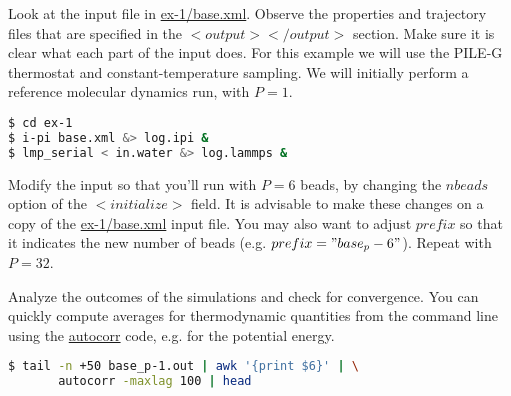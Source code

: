 \documentclass{article}
\begin{document}
\begin{Exercise}[label={basic},title={A PIMD simulation of liquid water}]

\Question 
Look at the \ipi{} input file in \url{ex-1/base.xml}. Observe the 
properties and trajectory files that are specified in the \lstinxml$<output></output>$ section. 
Make sure it is clear what each part 
of the input does. For this example
we will use the PILE-G thermostat\cite{ceri+11jcp} and 
constant-temperature sampling. We will 
initially perform a reference molecular dynamics run, with $P=1$. 

\begin{lstlisting}[language=bash]
$ cd ex-1 
$ i-pi base.xml &> log.ipi &
$ lmp_serial < in.water &> log.lammps & 
\end{lstlisting}%

\Question
Modify the input so that you'll run with
$P=6$ beads, by changing the \lstinxml$nbeads$ option of the \lstinxml$<initialize>$ field. 
It is advisable to make these changes on a copy of the  \url{ex-1/base.xml} input file.
You may also want to adjust \lstinxml$prefix$ so that it indicates the new number of beads (e.g. \lstinxml$prefix="base_p-6"$).
Repeat with $P=32$. 

\Question
Analyze the outcomes of the simulations and check for convergence. 
You can quickly compute averages for thermodynamic quantities from the command
line using the \url{autocorr} code, e.g. for the potential energy. 

\begin{lstlisting}[language=bash]
$ tail -n +50 base_p-1.out | awk '{print $6}' | \
       autocorr -maxlag 100 | head
\end{lstlisting}


\end{Exercise}
\end{document}
